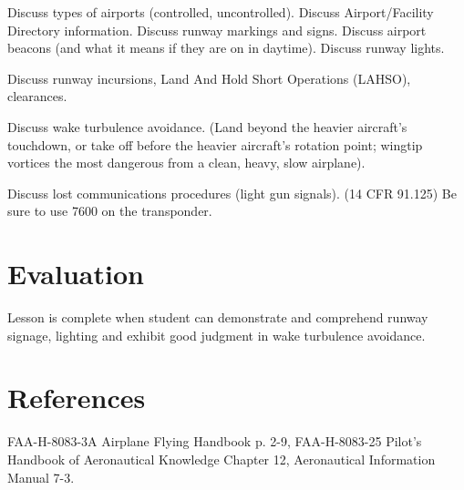 Discuss types of airports (controlled, uncontrolled). Discuss Airport/Facility
Directory information. Discuss runway markings and signs. Discuss airport
beacons (and what it means if they are on in daytime). Discuss runway lights.

Discuss runway incursions, Land And Hold Short Operations (LAHSO), clearances.

Discuss wake turbulence avoidance. (Land beyond the heavier aircraft’s
touchdown, or take off before the heavier aircraft’s rotation point; wingtip
vortices the most dangerous from a clean, heavy, slow airplane).

Discuss lost communications procedures (light gun signals). (14 CFR 91.125) Be
sure to use 7600 on the transponder.

\section{Evaluation}

Lesson is complete when student can demonstrate and comprehend runway signage,
lighting and exhibit good judgment in wake turbulence avoidance.

\section{References}

FAA-H-8083-3A Airplane Flying Handbook p. 2-9, FAA-H-8083-25 Pilot's Handbook
of Aeronautical Knowledge Chapter 12, Aeronautical Information Manual 7-3.

